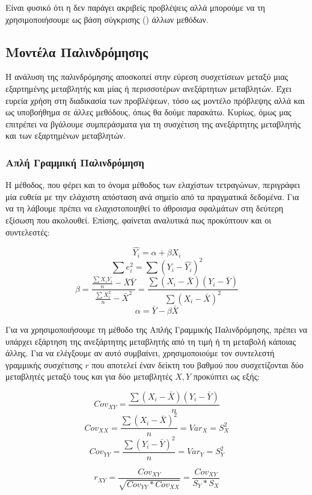Είναι φυσικό ότι η  δεν παράγει ακριβείς προβλέψεις αλλά μπορούμε να τη χρησιμοποιήσουμε ως βάση σύγκρισης () άλλων μεθόδων.

\subsection{Μοντέλα Παλινδρόμησης}

Η ανάλυση της παλινδρόμησης αποσκοπεί στην εύρεση συσχετίσεων μεταξύ μιας εξαρτημένης μεταβλητής και μίας ή περισσοτέρων ανεξάρτητων μεταβλητών. Έχει ευρεία χρήση στη διαδικασία των προβλέψεων, τόσο ως μοντέλο πρόβλεψης αλλά και ως υποβοήθημα σε άλλες μεθόδους, όπως θα δούμε παρακάτω. Κυρίως, όμως μας επιτρέπει να βγάλουμε συμπεράσματα για τη συσχέτιση της ανεξάρτητης μεταβλητής και των εξαρτημένων μεταβλητών.

\subsubsection{Απλή Γραμμική Παλινδρόμηση}

Η μέθοδος, που φέρει και το όνομα μέθοδος των ελαχίστων τετραγώνων, περιγράφει μία ευθεία με την ελάχιστη απόσταση ανά σημείο από τα πραγματικά δεδομένα. Για να τη λάβουμε πρέπει να ελαχιστοποιηθεί το άθροισμα σφαλμάτων στη δεύτερη εξίσωση που ακολουθεί. Επίσης, φαίνεται αναλυτικά πως προκύπτουν και οι συντελεστές:

\[\hat{Y_i} = \alpha + \beta X_i \]
\[ \sum{e_i^2} = \sum{(Y_i - \hat{Y_i})^2} \]
\[ \beta = \frac{ \frac{ \sum{X_i Y_i}}{n} - \bar{X} \bar{Y}} { \frac{\sum{X_i^2}}{n} - \bar{X}^2 } =  \frac{\sum{(X_i - \bar{X})(Y_i - \bar{Y})}} {\sum{(X_i - \bar{X})^2}} \]
\[ \alpha = \bar{Y} - \beta \bar{X} \]

Για να χρησιμοποιήσουμε τη μέθοδο της Απλής Γραμμικής Παλινδρόμησης, πρέπει να υπάρχει εξάρτηση της ανεξάρτητης μεταβλητής από τη τιμή ή τη μεταβολή κάποιας άλλης. Για να ελέγξουμε αν αυτό συμβαίνει, χρησιμοποιούμε τον συντελεστή γραμμικής συσχέτισης $r$ που αποτελεί έναν δείκτη του βαθμού που συσχετίζονται δύο μεταβλητές μεταξύ τους και για δύο μεταβλητές $X, Y$ προκύπτει ως εξής:

\[ {Cov}_{XY} = \frac{\sum{(X_i - \bar{X})(Y_i - \bar{Y})}}{n} \]
\[ {Cov}_{XX} = \frac{\sum{(X_i - \bar{X})^2}}{n} = {Var}_X = S_X^2 \]
\[ {Cov}_{YY} = \frac{\sum{(Y_i - \bar{Y})^2}}{n} = {Var}_Y = S_Y^2 \]


\[ r_{XY} = \frac{ {Cov}_{XY}} {\sqrt{{Cov}_{YY} *{Cov}_{XX} }} = \frac{ {Cov}_{XY} } { S_Y * S_X}
\]


